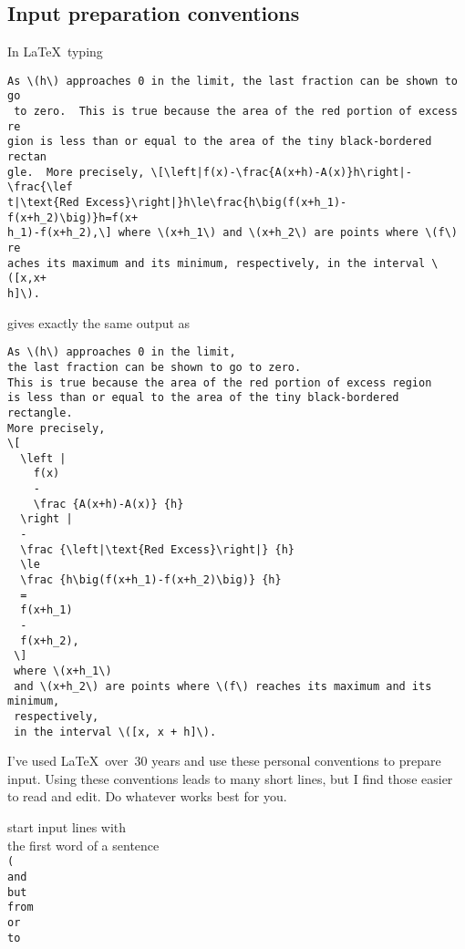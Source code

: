 
\subsection{Input preparation conventions}

In \LaTeX\ typing

\begin{verbatim}
As \(h\) approaches 0 in the limit, the last fraction can be shown to go
 to zero.  This is true because the area of the red portion of excess re
gion is less than or equal to the area of the tiny black-bordered rectan
gle.  More precisely, \[\left|f(x)-\frac{A(x+h)-A(x)}h\right|-\frac{\lef
t|\text{Red Excess}\right|}h\le\frac{h\big(f(x+h_1)-f(x+h_2)\big)}h=f(x+
h_1)-f(x+h_2),\] where \(x+h_1\) and \(x+h_2\) are points where \(f\) re
aches its maximum and its minimum, respectively, in the interval \([x,x+
h]\).
\end{verbatim}

gives exactly the same output as

\begin{verbatim}
As \(h\) approaches 0 in the limit,
the last fraction can be shown to go to zero.
This is true because the area of the red portion of excess region
is less than or equal to the area of the tiny black-bordered rectangle.
More precisely,
\[
  \left |
    f(x)
    -
    \frac {A(x+h)-A(x)} {h}
  \right |
  -
  \frac {\left|\text{Red Excess}\right|} {h}
  \le
  \frac {h\big(f(x+h_1)-f(x+h_2)\big)} {h}
  =
  f(x+h_1)
  -
  f(x+h_2),
 \]
 where \(x+h_1\)
 and \(x+h_2\) are points where \(f\) reaches its maximum and its minimum,
 respectively,
 in the interval \([x, x + h]\).
\end{verbatim}
    

I've used \LaTeX\ over~30 years
and use these personal conventions
to prepare input.
Using these conventions leads
to many short lines,
but I find those easier
to read and edit.
Do whatever works best for you.

 start input lines with\\
   the first word of a sentence\\
   \verb+(+\\
   \verb+and+\\
   \verb+but+\\
   \verb+from+\\
   \verb+or+\\
   \verb+to+

